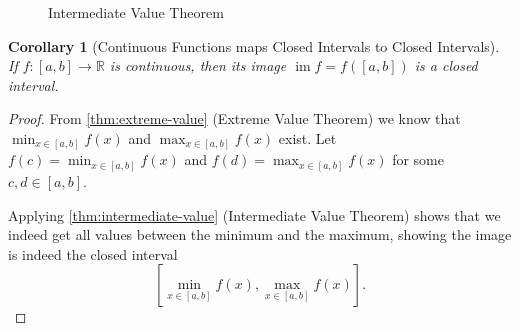 \documentclass[11pt]{article}
\numberwithin{equation}{section}
\newtheorem{corollary}[theorem]{Corollary}
\theoremstyle{definition}
\theoremstyle{remark}
\newcommand{\pqty}[1]{\left(#1\right)}
\newcommand{\ccintv}[2]{[#1,#2]}
\newcommand{\functiondomain}[3]{#1:#2\to #3}
\newcommand{\RR}{\mathbb R}
\DeclareMathOperator{\img}{im}
\begin{document}
\begin{figure}[ht!]
    \centering

    \caption{Intermediate Value Theorem}
    \label{fig:intermediate-value}
\end{figure}

\begin{corollary}[Continuous Functions maps Closed Intervals to Closed Intervals]\label{analysis-unit-0096}
    \label{cor:continuous-closed-intv}%
    If \(\functiondomain{f}{\ccintv{a}{b}}{\RR}\) is continuous, then its image \(\img f = f\pqty{\ccintv{a}{b}}\) is a closed interval.
\end{corollary}

\begin{proof}
    From \autoref{thm:extreme-value} (Extreme Value Theorem) we know that \(\min_{x \in \ccintv{a}{b}} f\pqty{x}\) and \(\max_{x \in \ccintv{a}{b}} f\pqty{x}\) exist. Let \(f\pqty{c} = \min_{x \in \ccintv{a}{b}} f\pqty{x}\) and \(f\pqty{d} = \max_{x \in \ccintv{a}{b}} f\pqty{x}\) for some \(c, d \in \ccintv{a}{b}\).

    Applying \autoref{thm:intermediate-value} (Intermediate Value Theorem) shows that we indeed get all values between the minimum and the maximum, showing the image is indeed the closed interval
    \[
        \ccintv{\min_{x \in \ccintv{a}{b}} f\pqty{x}}{\max_{x \in \ccintv{a}{b}} f\pqty{x}}.
    \]
\end{proof}
\end{document}
